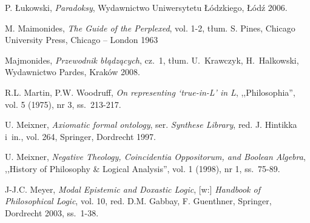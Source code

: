 \begin{thebibliography}{100}
P. Łukowski, \textit{Paradoksy}, Wydawnictwo Uniwersytetu Łódzkiego, Łódź 2006.

M. Maimonides, \textit{The Guide of the Perplexed}, vol. 1-2, tłum. S. Pines, Chicago University Press, Chicago -- London 1963


Majmonides, \textit{Przewodnik błądzących}, cz.~1, tłum. U.~Krawczyk, H.~Halkowski, Wydawnictwo Pardes, Kraków 2008.



R.L. Martin, P.W. Woodruff, \textit{On representing ‘true-in-L' in L}, ,,Philosophia'', vol. 5 (1975), nr 3, ss.~213-217.


U. Meixner, \textit{Axiomatic formal ontology}, ser. \textit{Synthese Library}, red. J. Hintikka i~in., vol. 264, Springer, Dordrecht 1997.

U. Meixner, \textit{Negative Theology, Coincidentia Oppositorum, and Boolean Algebra}, ,,History of Philosophy \& Logical Analysis'', vol. 1 (1998), nr 1, ss.~75-89.


J-J.C. Meyer, \textit{Modal Epistemic and Doxastic Logic}, [w:] \textit{Handbook of Philosophical Logic}, vol. 10, red. D.M. Gabbay, F. Guenthner, Springer, Dordrecht 2003, ss.~1-38.


\end{thebibliography}

